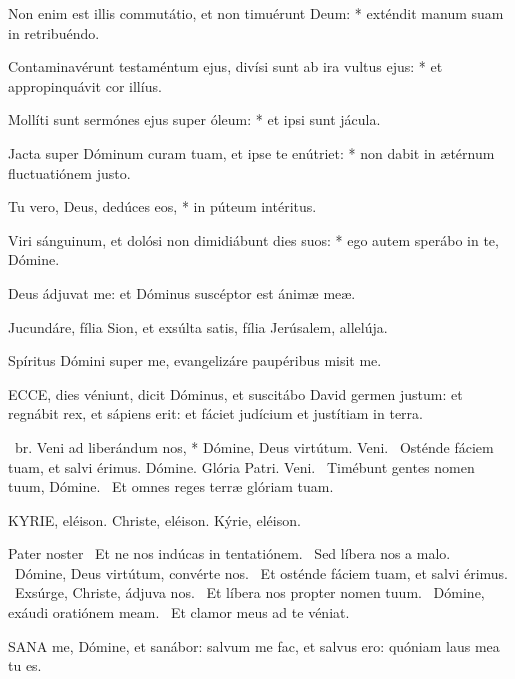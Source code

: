 Non enim est illis commutátio, et non timuérunt Deum: * exténdit manum suam in retribuéndo.

Contaminavérunt testaméntum ejus, divísi sunt ab ira vultus ejus: * et appropinquávit cor illíus.

Mollíti sunt sermónes ejus super óleum: * et ipsi sunt jácula.

Jacta super Dóminum curam tuam, et ipse te enútriet: * non dabit in ætérnum fluctuatiónem justo.

Tu vero, Deus, dedúces eos, * in púteum intéritus.

Viri sánguinum, et dolósi non dimidiábunt dies suos: * ego autem sperábo in te, Dómine.

  Deus ádjuvat me: et Dóminus suscéptor est ánimæ meæ.


  Jucundáre, fília Sion, et exsúlta satis, fília Jerúsalem, allelúja.

  Spíritus Dómini super me, evangelizáre paupéribus misit me.


\lettrine[lines=2]{E}{CCE}, dies véniunt, dicit Dóminus, et suscitábo David germen justum: et regnábit rex, et sápiens erit: et fáciet judícium et justítiam in terra.

\R\ br. Veni ad liberándum nos, * Dómine, Deus virtútum. Veni. \V\ Osténde fáciem tuam, et salvi érimus. Dómine. Glória Patri. Veni. \V\ Timébunt gentes nomen tuum, Dómine. \R\ Et omnes reges terræ glóriam tuam.


KYRIE, eléison. Christe, eléison. Kýrie, eléison.

Pater noster  \V\ Et ne nos indúcas in tentatiónem. \R\ Sed líbera nos a malo. \V\ Dómine, Deus virtútum, convérte nos. \R\ Et osténde fáciem tuam, et salvi érimus. \V\ Exsúrge, Christe, ádjuva nos. \R\ Et líbera nos propter nomen tuum. \V\ Dómine, exáudi oratiónem meam. \R\ Et clamor meus ad te véniat.




\lettrine[lines=2]{S}{ANA} me, Dómine, et sanábor: salvum me fac, et salvus ero: quóniam laus mea tu es.

